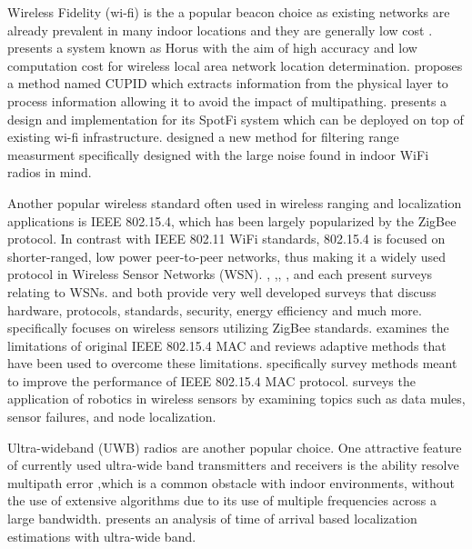 \documentclass[conference]{IEEEtran}
\begin{document}
			Wireless Fidelity (wi-fi)  is the a popular beacon choice as existing networks are already prevalent in many indoor locations and they are generally low cost \cite{Youssef2005} \cite{Sen2013} \cite{Kotaru2015} \cite{Rea2017}. \cite{Youssef2005} presents a system known as Horus with the aim of high accuracy and low computation cost for wireless local area network location determination. \cite{Sen2013} proposes a method named CUPID which extracts information from the physical layer to process information allowing it to avoid the impact of multipathing. \cite{Kotaru2015} presents a design and implementation for its SpotFi system which can be deployed on top of existing wi-fi infrastructure. \cite{Rea2017} designed a new method for filtering range measurment specifically designed with the large noise found in indoor WiFi radios in mind. 

			 Another popular wireless standard often used in wireless ranging and localization applications is IEEE 802.15.4, which has been largely popularized by the ZigBee protocol. In contrast with IEEE 802.11 WiFi standards, 802.15.4 is focused on shorter-ranged, low power peer-to-peer networks, thus making it a widely used protocol in Wireless Sensor Networks (WSN).  \cite{Baronti2007}, \cite{Khanafer2014},\cite{Shue2013}, \cite{Akyildiz2002}, and \cite{Xia2011} each present surveys relating to WSNs. \cite{Baronti2007} and \cite{Akyildiz2002} both provide very well developed surveys that discuss hardware, protocols, standards, security, energy efficiency and much more. \cite{Baronti2007} specifically focuses on wireless sensors utilizing ZigBee standards. \cite{Xia2011} examines the limitations of original IEEE 802.15.4 MAC and reviews adaptive methods that have been used to overcome these limitations. \cite{Khanafer2014} specifically survey methods meant to improve the performance of IEEE 802.15.4 MAC protocol. \cite{Shue2013} surveys the application of robotics in wireless sensors by examining topics such as data mules, sensor failures, and node localization. 
			 
			 Ultra-wideband (UWB) radios are another popular choice. One attractive feature of currently used ultra-wide band transmitters and receivers is the ability resolve multipath error ,which is a common obstacle with indoor environments, without the use of extensive algorithms due to its use of multiple frequencies across a large bandwidth. \cite{Gezici2005} presents an analysis of time of arrival based localization estimations with ultra-wide band. 
\end{document}
